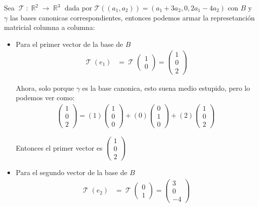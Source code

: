 \documentclass[12pt, fleqn]{report}                             %
\theoremstyle{break}                                            %
\DeclareMathOperator \Reals        {\mathbb{R}}                 %
\DeclareMathOperator \LinTrans {\mathcal{T}}                    %
\newcommand{\Wrap}[1]    {\left( #1 \right)}                    %
\newcommand{\FnLinTrans}[1]{\mathcal{T}\Wrap{#1}}               %
\newcommand{\pVector}[1]                                        %
        { \ensuremath{\begin{pmatrix}#1\end{pmatrix}} }             %
\begin{document}
                    Sea $\LinTrans: \Reals^2 \to \Reals^3$ dada por $\FnLinTrans{(a_1, a_2)} = (a_1 +3a_2, 0, 2a_1-4a_2)$
                    con $B$ y $\gamma$ las bases canonicas correspondientes, entonces
                    podemos armar la represetanción matricial columna a columna:

                    \begin{itemize}
                        \item Para el primer vector de la base de $B$
                            \begin{align*}
                                \LinTrans(e_1) 
                                    &= \LinTrans\pVector{1\\0}          
                                    = \pVector{1\\0\\2}            
                            \end{align*}

                            Ahora, solo porque $\gamma$ es la base canonica, esto suena medio estupido, pero
                            lo podemos ver como:
                            \begin{align*}
                                \pVector{1\\0\\2} 
                                    = (1)\pVector{1\\0\\0} + (0)\pVector{0\\1\\0} + (2)\pVector{1\\0\\2}
                            \end{align*}

                            Entonces el primer vector es $\pVector{1\\0\\2}$

                        \item Para el segundo vector de la base de $B$
                            \begin{align*}
                                \LinTrans(e_2) 
                                    &= \LinTrans\pVector{0\\1}          
                                    = \pVector{3\\0\\-4}            
                            \end{align*}


\end{itemize}
\end{document}
